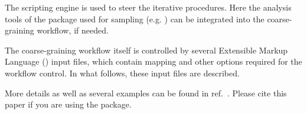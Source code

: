 The scripting engine is used to steer the iterative procedures. Here the analysis tools of the package used for sampling (e.g. \gromacs) can be integrated into the coarse-graining workflow, if needed.

The coarse-graining workflow itself is controlled by several Extensible Markup Language (\xml) input files, which contain mapping and other options required for the workflow control. In what follows, these input files are described.

More details as well as several examples can be found in ref.~\cite{Ruehle:2009.a}. Please cite this paper if you are using the package. 